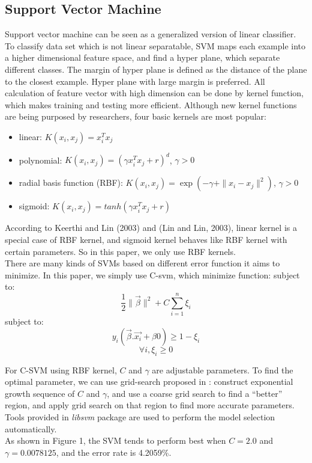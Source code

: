 \documentclass[a4paper,11pt]{article}
\begin{document}
\subsection{Support Vector Machine}
Support vector machine can be seen as a generalized version of linear classifier. To classify data set which is not linear separatable, SVM maps each example into a higher dimensional feature space, and find a hyper plane, which separate different classes. The margin of hyper plane is defined as the distance of the plane to the closest example. Hyper plane with large margin is preferred. All calculation of feature vector with high dimension can be done by kernel function, which makes training and testing more efficient. Although new kernel functions are being purposed by researchers, four basic kernels are most popular:\cite{SVM}
\begin{itemize}
\item linear: $K(x_i,x_j)=x_i^Tx_j$\\
\item polynomial: $K(x_i,x_j)=(\gamma x_i^Tx_j+r)^d$, $\gamma >0$\\
\item radial basis function (RBF): $K(x_i,x_j)=\exp(-\gamma + \|x_i-x_j\|^2)$, $\gamma > 0$\\
\item sigmoid: $K(x_i,x_j)=tanh(\gamma x_i^Tx_j+r)$\\
\end{itemize}
According to Keerthi and Lin (2003) and (Lin and Lin, 2003), linear kernel is a special case of RBF kernel, and sigmoid kernel behaves like RBF kernel with certain parameters. So in this paper, we only use RBF kernels.\\
There are many kinds of SVMs based on different error function it aims to minimize. In this paper, we simply use C-svm, which minimize function:
 subject to:$$\frac{1}{2}\|\vec{\beta}\|^2+C\sum_{i=1}^n \xi_i$$
 subject to:$$y_i(\vec{\beta}.\vec{x_i}+\beta{0})\geq 1-\xi_i$$$$\forall i, \xi_i\geq 0$$

For C-SVM using RBF kernel, $C$ and $\gamma$ are adjustable parameters. To find the optimal parameter, we can use grid-search proposed in \cite{SVM}: construct exponential growth sequence of $C$ and $\gamma$, and use a coarse grid search to find a ``better'' region, and apply grid search on that region to find more accurate parameters. Tools provided in \emph{libsvm} package are used to perform the model selection automatically.\\
As shown in Figure 1, the SVM tends to perform best when $C=2.0$ and $\gamma=0.0078125$, and the error rate is 4.2059\%.
\end{document}
